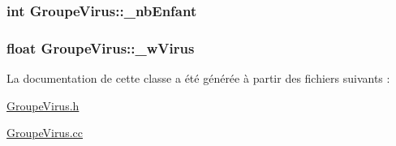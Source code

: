 \hypertarget{classGroupeVirus_a74d8697c0c4c8988fe16b1c6c7947b1f}{
\subsubsection[{\_\-nbEnfant}]{\setlength{\rightskip}{0pt plus 5cm}int {\bf GroupeVirus::\_\-nbEnfant}}}
\label{classGroupeVirus_a74d8697c0c4c8988fe16b1c6c7947b1f}
\hypertarget{classGroupeVirus_a134202eca48cc8f3fc90c2c575f9e334}{
\subsubsection[{\_\-wVirus}]{\setlength{\rightskip}{0pt plus 5cm}float {\bf GroupeVirus::\_\-wVirus}}}
\label{classGroupeVirus_a134202eca48cc8f3fc90c2c575f9e334}


La documentation de cette classe a été générée à partir des fichiers suivants :\begin{DoxyCompactItemize}
\item 
\hyperlink{GroupeVirus_8h}{GroupeVirus.h}\item 
\hyperlink{GroupeVirus_8cc}{GroupeVirus.cc}\end{DoxyCompactItemize}
